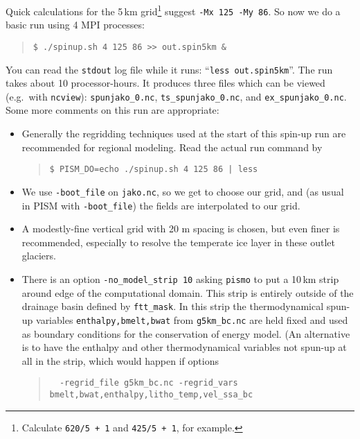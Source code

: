Quick calculations for the 5\,km grid\footnote{Calculate \texttt{620/5 + 1} and \texttt{425/5 + 1}, for example.} suggest \verb|-Mx 125 -My 86|.  So now we do a basic run using 4 MPI processes:
\begin{quote}\small
\begin{verbatim}
$ ./spinup.sh 4 125 86 >> out.spin5km &
\end{verbatim}
\normalsize\end{quote}
You can read the \texttt{stdout} log file while it runs: ``\verb|less out.spin5km|''.  The run takes about 10 processor-hours.   %
It produces three files which can be viewed (e.g.~with \verb|ncview|): \verb|spunjako_0.nc|, \verb|ts_spunjako_0.nc|, and \verb|ex_spunjako_0.nc|.  Some more comments on this run are appropriate:
\begin{itemize}
\item Generally the regridding techniques used at the start of this spin-up run are recommended for regional modeling.  Read the actual run command by
\begin{quote}\small
\begin{verbatim}
$ PISM_DO=echo ./spinup.sh 4 125 86 | less
\end{verbatim}
\normalsize\end{quote}
\item  We use \verb|-boot_file| on \verb|jako.nc|, so we get to choose our grid, and (as usual in PISM with \verb|-boot_file|) the fields are interpolated to our grid.
\item A modestly-fine vertical grid with 20 m spacing is chosen, but even finer is recommended, especially to resolve the temperate ice layer in these outlet glaciers.
\item There is an option \verb|-no_model_strip 10| asking \verb|pismo| to put a 10\,km strip around edge of the computational domain.  This strip is entirely outside of the drainage basin defined by \verb|ftt_mask|.  In this strip the thermodynamical spun-up variables \verb|enthalpy,bmelt,bwat| from \verb|g5km_bc.nc| are held fixed and used as boundary conditions for the conservation of energy model. (An alternative is to have the enthalpy and other thermodynamical variables not spun-up at all in the strip, which would happen if options 
\begin{quote}\small
\begin{verbatim}
  -regrid_file g5km_bc.nc -regrid_vars bmelt,bwat,enthalpy,litho_temp,vel_ssa_bc
\end{verbatim}

\end{quote}
\end{itemize}
